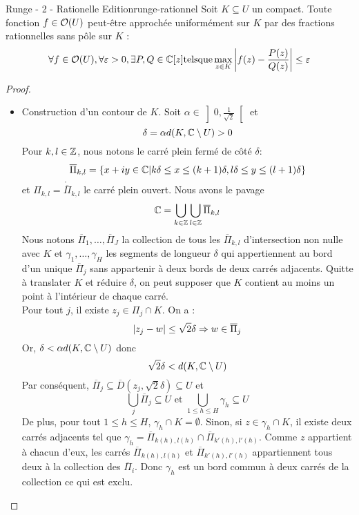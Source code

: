 \documentclass{cours}
\begin{document}
\begin{théorème}{Runge - 2 - Rationelle Edition}{runge-rationnel}
    Soit $K \subseteq U$ un compact. Toute fonction $f \in \mathcal{O}(U)$ peut-être approchée uniformément sur $K$ par des fractions rationnelles sans pôle sur $K$ : 
    \[
        \forall f \in \mathcal{O}(U), \forall \varepsilon > 0, \exists P, Q \in \mathbb{C}[z] \mathrm{ tels que } \max_{z \in K}\left|f(z) - \frac{P(z)}{Q(z)}\right| \leq \varepsilon
    \]
\end{théorème}
\begin{proof}
    \begin{itemize}
        \item Construction d'un contour de $K$. Soit $\alpha \in \left]0, \frac{1}{\sqrt{2}}\right[$ et 
        \[
            \delta = \alpha d(K, \mathbb{C} \setminus U) > 0
        \]
        Pour $k, l \in \mathbb{Z}$, nous notons le carré plein fermé de côté $\delta$: 
        \[
            \overline{\Pi}_{k, l} = \left\{x + iy \in \mathbb{C} \middle| k \delta \leq x \leq (k + 1)\delta, l\delta \leq y \leq (l + 1)\delta\right\}
        \]
        et $\Pi_{k, l} = \mathring{\overline{\Pi}}_{k, l}$ le carré plein ouvert. Nous avons le pavage
        \[
            \mathbb{C} = \bigcup_{k \in \mathbb{Z}} \bigcup_{l \in \mathbb{Z}} \overline{\Pi}_{k, l}
        \]
        Nous notons $\overline{\Pi}_{1}, \ldots, \overline{\Pi}_{J}$ la collection de tous les $\overline{\Pi}_{k, l}$ d'intersection non nulle avec $K$ et $\gamma_{1}, \ldots, \gamma_{H}$ les segments de longueur $\delta$ qui appertiennent au bord d'un unique $\overline{\Pi}_{j}$ sans appartenir à deux bords de deux carrés adjacents. Quitte à translater $K$ et réduire $\delta$, on peut supposer que $K$ contient au moins un point à l'intérieur de chaque carré. \\
        Pour tout $j$, il existe $z_{j} \in \Pi_{j} \cap K$. On a : 
        \[
            \left|z_{j} - w\right| \leq \sqrt{2}\delta \Rightarrow w \in \overline{\Pi}_{j}
        \]
        Or, $\delta < \alpha d(K, \mathbb{C} \setminus U)$ donc 
        \[
            \sqrt{2}\delta < d(K, \mathbb{C} \setminus U)
        \]
        Par conséquent, $\overline{\Pi}_{j} \subseteq \overline{D}(z_{j}, \sqrt{2}\delta) \subseteq U$ et 
        \[
            \bigcup_{j} \overline{\Pi}_{j} \subseteq U \text{ et } \bigcup_{1 \leq h \leq H} \gamma_{h} \subseteq U
        \]
        De plus, pour tout $1 \leq h \leq H$, $\gamma_{h} \cap K = \emptyset$. Sinon, si $z \in \gamma_{h} \cap K$, il existe deux carrés adjacents tel que $\gamma_{h} = \overline{\Pi}_{k(h), l(h)} \cap \overline{\Pi}_{k'(h), l'(h)}$. Comme $z$ appartient à chacun d'eux, les carrés $\overline{\Pi}_{k(h), l(h)}$ et $\overline{\Pi}_{k'(h), l'(h)}$ appartiennent tous deux à la collection des $\overline{\Pi}_{i}$. Donc $\gamma_{h}$ est un bord commun à deux carrés de la collection ce qui est exclu. 

\end{itemize}
\end{proof}
\end{document}
